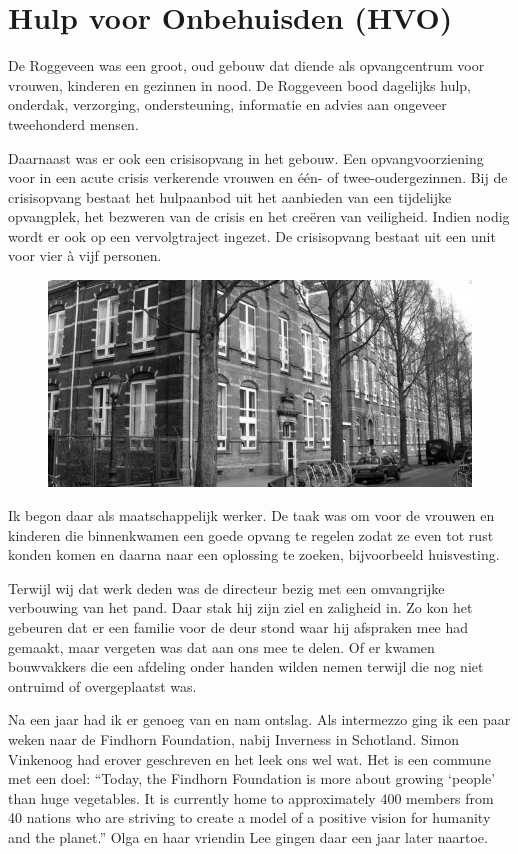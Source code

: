 \documentclass[12pt,twoside, openright]{memoir}
\begin{document}
\section*{Hulp voor Onbehuisden (HVO)} %
\label{cha:hvo}

De Roggeveen was een groot, oud gebouw dat diende als opvangcentrum voor vrouwen, kinderen en gezinnen in nood. De Roggeveen bood dagelijks hulp, onderdak, verzorging, ondersteuning, informatie en advies aan ongeveer tweehonderd mensen.

Daarnaast was er ook een crisisopvang in het gebouw. Een opvangvoorziening voor in een acute crisis verkerende vrouwen en één- of twee-oudergezinnen. Bij de crisisopvang bestaat het hulpaanbod uit het aanbieden van een tijdelijke opvangplek, het bezweren van de crisis en het creëren van veiligheid. Indien nodig wordt er ook op een vervolgtraject ingezet. De crisisopvang bestaat uit een unit voor vier à vijf personen.

\begin{figure}
\centering
\includegraphics[width=\textwidth]{img/268roggeveen-}
\caption*{\footnotesize }
\end{figure}

Ik begon daar als maatschappelijk werker. De taak was om voor de vrouwen en kinderen die binnenkwamen een goede opvang te regelen zodat ze even tot rust konden komen en daarna naar een oplossing te zoeken, bijvoorbeeld huisvesting. 

Terwijl wij dat werk deden was de directeur bezig met een omvangrijke verbouwing van het pand. Daar stak hij zijn ziel en zaligheid in. Zo kon het gebeuren dat er een familie voor de deur stond waar hij afspraken mee had gemaakt, maar vergeten was dat aan ons mee te delen. Of er kwamen bouwvakkers die een afdeling onder handen wilden nemen terwijl die nog niet ontruimd of overgeplaatst was. 

Na een jaar had ik er genoeg van en nam ontslag. Als intermezzo ging ik een paar weken naar de Findhorn Foundation, nabij Inverness in Schotland. Simon Vinkenoog had erover geschreven en het leek ons wel wat. Het is een commune met een doel: ``Today, the Findhorn Foundation is more about growing `people' than huge vegetables. It is currently home to approximately 400 members from 40 nations who are striving to create a model of a positive vision for humanity and the planet.'' Olga en haar vriendin Lee gingen daar een jaar later naartoe.
\end{document}
